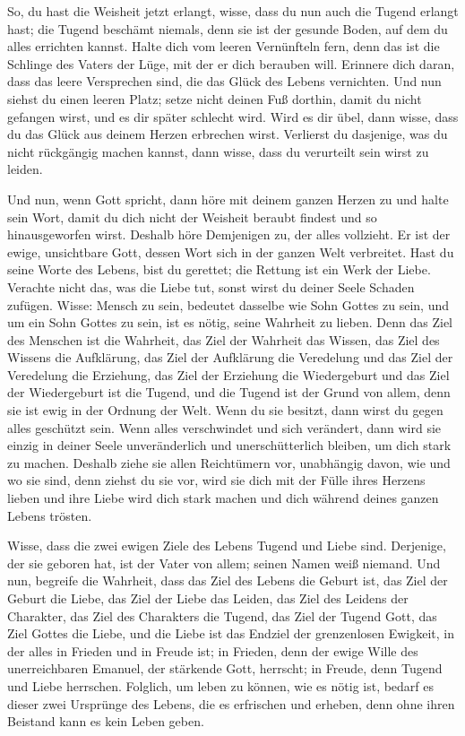 So, du hast die Weisheit jetzt erlangt, wisse, dass du nun auch die Tugend erlangt hast; die Tugend beschämt niemals, denn sie ist der gesunde Boden, auf dem du alles errichten kannst. Halte dich vom leeren Vernünfteln fern, denn das ist die Schlinge des Vaters der Lüge, mit der er dich berauben will. Erinnere dich daran, dass das leere Versprechen sind, die das Glück des Lebens vernichten. Und nun siehst du einen leeren Platz; setze nicht deinen Fuß dorthin, damit du nicht gefangen wirst, und es dir später schlecht wird. Wird es dir übel, dann wisse, dass du das Glück aus deinem Herzen erbrechen wirst. Verlierst du dasjenige, was du nicht rückgängig machen kannst, dann wisse, dass du verurteilt sein wirst zu leiden.

Und nun, wenn Gott spricht, dann höre mit deinem ganzen Herzen zu und halte sein Wort, damit du dich nicht der Weisheit beraubt findest und so hinausgeworfen wirst. Deshalb höre Demjenigen zu, der alles vollzieht. Er ist der ewige, unsichtbare Gott, dessen Wort sich in der ganzen Welt verbreitet. Hast du seine Worte des Lebens, bist du gerettet; die Rettung ist ein Werk der Liebe. Verachte nicht das, was die Liebe tut, sonst wirst du deiner Seele Schaden zufügen. Wisse: Mensch zu sein, bedeutet dasselbe wie Sohn Gottes zu sein, und um ein Sohn Gottes zu sein, ist es nötig, seine Wahrheit zu lieben. Denn das Ziel des Menschen ist die Wahrheit, das Ziel der Wahrheit das Wissen, das Ziel des Wissens die Aufklärung, das Ziel der Aufklärung die Veredelung und das Ziel der Veredelung die Erziehung, das Ziel der Erziehung die Wiedergeburt und das Ziel der Wiedergeburt ist die Tugend, und die Tugend ist der Grund von allem, denn sie ist ewig in der Ordnung der Welt. Wenn du sie besitzt, dann wirst du gegen alles geschützt sein. Wenn alles verschwindet und sich verändert, dann wird sie einzig in deiner Seele unveränderlich und unerschütterlich bleiben, um dich stark zu machen. Deshalb ziehe sie allen Reichtümern vor, unabhängig davon, wie und wo sie sind, denn ziehst du sie vor, wird sie dich mit der Fülle ihres Herzens lieben und ihre Liebe wird dich stark machen und dich während deines ganzen Lebens trösten.

Wisse, dass die zwei ewigen Ziele des Lebens Tugend und Liebe sind. Derjenige, der sie geboren hat, ist der Vater von allem; seinen Namen weiß niemand. Und nun, begreife die Wahrheit, dass das Ziel des Lebens die Geburt ist, das Ziel der Geburt die Liebe, das Ziel der Liebe das Leiden, das Ziel des Leidens der Charakter, das Ziel des Charakters die Tugend, das Ziel der Tugend Gott, das Ziel Gottes die Liebe, und die Liebe ist das Endziel der grenzenlosen Ewigkeit, in der alles in Frieden und in Freude ist; in Frieden, denn der ewige Wille des unerreichbaren Emanuel, der stärkende Gott, herrscht; in Freude, denn Tugend und Liebe herrschen. Folglich, um leben zu können, wie es nötig ist, bedarf es dieser zwei Ursprünge des Lebens, die es erfrischen und erheben, denn ohne ihren Beistand kann es kein Leben geben. 

